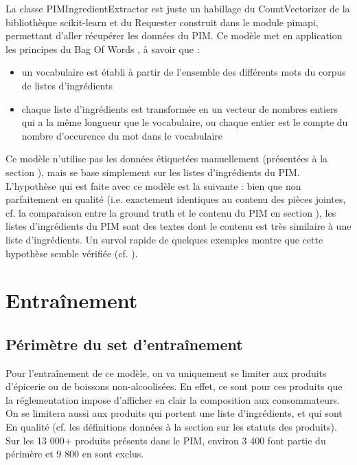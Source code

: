             La classe PIMIngredientExtractor est juste un habillage du CountVectorizer de la bibliothèque scikit-learn et du Requester construit dans le module pimapi, permettant d'aller récupérer les données du PIM.
            Ce modèle met en application les principes du \og Bag Of Words \fg \cite{bag_of_words_wiki}, à savoir que :
            \begin{itemize}
                \item un vocabulaire est établi à partir de l'ensemble des différents mots du corpus de listes d'ingrédients
                \item chaque liste d'ingrédients est transformée en un vecteur de nombres entiers qui a la même longueur que le vocabulaire, ou chaque entier est le compte du nombre d'occurence du mot dans le vocabulaire
            \end{itemize}

            Ce modèle n'utilise pas les données étiquetées manuellement (présentées à la section ), mais se base simplement sur les listes d'ingrédients du PIM.
            L'hypothèse qui est faite avec ce modèle est la suivante : bien que non parfaitement en qualité (i.e. exactement identiques au contenu des pièces jointes, cf. la comparaison entre la ground truth et le contenu du PIM en section ), les listes d'ingrédients du PIM sont des textes dont le contenu est très similaire à une liste d'ingrédients.
            Un survol rapide de quelques exemples montre que cette hypothèse semble vérifiée (cf. ).

        \section{Entraînement}

            \subsection{Périmètre du set d'entraînement}
            
            Pour l'entraînement de ce modèle, on va uniquement se limiter aux produits d'épicerie ou de boissons non-alcoolisées.
            En effet, ce sont pour ces produits que la réglementation impose d'afficher en clair la composition aux consommateurs.
            On se limitera aussi aux produits qui portent une liste d'ingrédients, et qui sont \og En qualité \fg (cf. les définitions données à la section  sur les statuts des produits).
            Sur les 13 000+ produits présents dans le PIM, environ 3 400 font partie du périmère et 9 800 en sont exclus.

